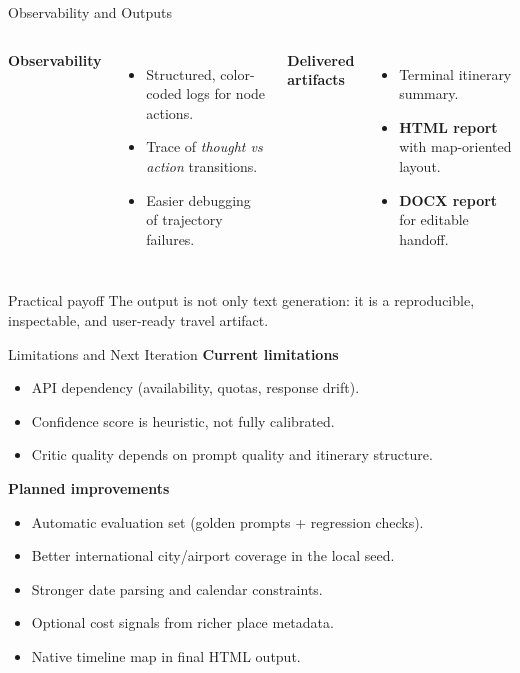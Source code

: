 \documentclass[9pt]{beamer}
\begin{document}
\begin{frame}{Observability and Outputs}
\begin{columns}[t]
\textbf{Observability}
\begin{itemize}
    \item Structured, color-coded logs for node actions.
    \item Trace of \textit{thought vs action} transitions.
    \item Easier debugging of trajectory failures.
\end{itemize}

\textbf{Delivered artifacts}
\begin{itemize}
    \item Terminal itinerary summary.
    \item \textbf{HTML report} with map-oriented layout.
    \item \textbf{DOCX report} for editable handoff.
\end{itemize}
\end{columns}

\vspace{0.2cm}
\begin{block}{Practical payoff}
The output is not only text generation: it is a reproducible, inspectable,
and user-ready travel artifact.
\end{block}
\end{frame}

\begin{frame}{Limitations and Next Iteration}
\textbf{Current limitations}
\begin{itemize}
    \item API dependency (availability, quotas, response drift).
    \item Confidence score is heuristic, not fully calibrated.
    \item Critic quality depends on prompt quality and itinerary structure.
\end{itemize}

\textbf{Planned improvements}
\begin{itemize}
    \item Automatic evaluation set (golden prompts + regression checks).
    \item Better international city/airport coverage in the local seed.
    \item Stronger date parsing and calendar constraints.
    \item Optional cost signals from richer place metadata.
    \item Native timeline map in final HTML output.
\end{itemize}
\end{frame}
\end{document}

